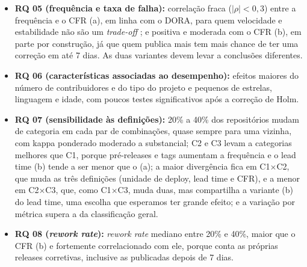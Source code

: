\begin{itemize}
\item \textbf{RQ 05 (frequência e taxa de falha):} correlação fraca ($|\rho| < 0{,}3$) entre a frequência e o CFR (a), em linha com o DORA, para quem velocidade e estabilidade não são um \textit{trade-off} \cite{dora2024report}; e positiva e moderada com o CFR (b), em parte por construção, já que quem publica mais tem mais chance de ter uma correção em até 7 dias. As duas variantes devem levar a conclusões diferentes.
\item \textbf{RQ 06 (características associadas ao desempenho):} efeitos maiores do número de contribuidores e do tipo do projeto e pequenos de estrelas, linguagem e idade, com poucos testes significativos após a correção de Holm.
\item \textbf{RQ 07 (sensibilidade às definições):} 20\% a 40\% dos repositórios mudam de categoria em cada par de combinações, quase sempre para uma vizinha, com kappa ponderado moderado a substancial; C2 e C3 levam a categorias melhores que C1, porque pré-releases e tags aumentam a frequência e o lead time (b) tende a ser menor que o (a); a maior divergência fica em C1$\times$C2, que muda as três definições (unidade de deploy, lead time e CFR), e a menor em C2$\times$C3, que, como C1$\times$C3, muda duas, mas compartilha a variante (b) do lead time, uma escolha que esperamos ter grande efeito; e a variação por métrica supera a da classificação geral.
\item \textbf{RQ 08 (\textit{rework rate}):} \textit{rework rate} mediano entre 20\% e 40\%, maior que o CFR (b) e fortemente correlacionado com ele, porque conta as próprias releases corretivas, inclusive as publicadas depois de 7 dias.
\end{itemize}
